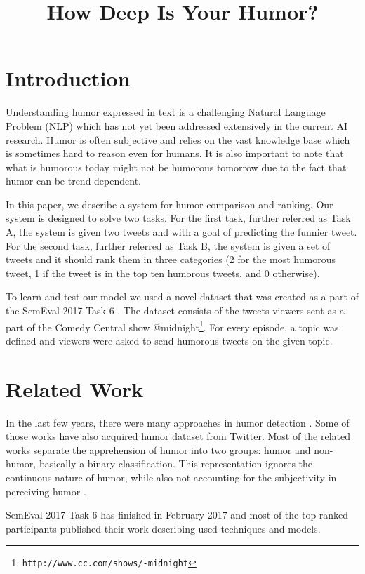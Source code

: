 \documentclass[10pt, a4paper]{article}
\title{How Deep Is Your Humor?}
\begin{document}
\maketitleabstract

\section{Introduction}

Understanding humor expressed in text is a challenging Natural Language 
Problem (NLP) which has not yet been addressed extensively in the current AI research.
Humor is often subjective and relies on the vast knowledge base which is sometimes
hard to reason even for humans. It is also important to note that what is humorous
today might not be humorous tomorrow due to the fact that humor can be trend dependent.

In this paper, we describe a system for humor comparison and
ranking. Our system is designed to solve two tasks. For the first task, further
referred as Task A, the system is given two tweets and with a goal of predicting the funnier tweet.
For the second task, further referred as Task B, the system is given a set of tweets and it should rank them
in three categories (2 for the most humorous tweet, 1 if the tweet is in the top ten humorous
tweets, and 0 otherwise).

To learn and test our model we used a novel dataset that was
created as a part of the SemEval-2017 Task 6 \citep{potash2016hashtagwars}. The dataset consists of
the tweets viewers sent as a part of the Comedy Central show
@midnight\footnote{\texttt{http://www.cc.com/shows/-midnight}}. For every
episode, a topic was defined and viewers were asked to send humorous
tweets on the given topic.

\section{Related Work}

In the last few years, there were many approaches in humor detection \citep{mihalcea2005,reyes2013,zhang2014,barbieri2014,yang2015}.
Some of those works \citep{reyes2013,zhang2014,barbieri2014} have also acquired
humor dataset from Twitter. Most of the related works separate the apprehension of humor into two groups: humor and non-humor, basically a binary classification.
This representation ignores the continuous nature of humor, while also not accounting
for the subjectivity in perceiving humor \citep{potash2016hashtagwars}.

SemEval-2017 Task 6 has finished in February 2017 and most of the top-ranked
participants \citep{humorhawk2017,takelab2017,datastories2017} published their
work describing used techniques and models.
\end{document}
